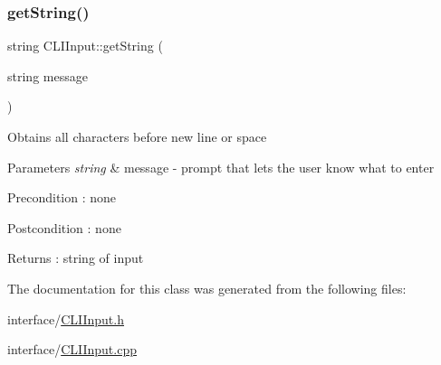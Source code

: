 \subsubsection{\texorpdfstring{get\+String()}{getString()}}
{\footnotesize\ttfamily string C\+L\+I\+Input\+::get\+String (\begin{DoxyParamCaption}\item[{string}]{message }\end{DoxyParamCaption})}

Obtains all characters before new line or space 
\begin{DoxyParams}{Parameters}
{\em string} & message -\/ prompt that lets the user know what to enter \\
\hline
\end{DoxyParams}
\begin{DoxyPrecond}{Precondition}
\+: none 
\end{DoxyPrecond}
\begin{DoxyPostcond}{Postcondition}
\+: none 
\end{DoxyPostcond}
\begin{DoxyReturn}{Returns}
\+: string of input 
\end{DoxyReturn}


The documentation for this class was generated from the following files\+:\begin{DoxyCompactItemize}
\item 
interface/\mbox{\hyperlink{_c_l_i_input_8h}{C\+L\+I\+Input.\+h}}\item 
interface/\mbox{\hyperlink{_c_l_i_input_8cpp}{C\+L\+I\+Input.\+cpp}}\end{DoxyCompactItemize}
